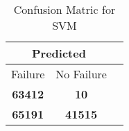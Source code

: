 \begin{table}[] 
\caption{Confusion Matric for SVM} 
\label{Table: Prediction Accuracy-NoneSVMSVMEKF-ignoresolarPanelDipole100.9EKF-top2-solarPanelDipole} 
\centering 
\begin{tabular} 
 {@{}ccc@{}} 
\toprule 
\multicolumn{2}{c}{\textbf{Predicted}}
 \\ \midrule 
\multicolumn{1}{|c|}{Failure} & 
\multicolumn{1}{c|}{No Failure}
 \\ \midrule 
\multicolumn{1}{|c|}{\color{red}\textbf{63412}} & 
\multicolumn{1}{c|}{\color{red}\textbf{10}}
 \\ \midrule 
\multicolumn{1}{|c|}{\color{green}\textbf{65191}} & 
\multicolumn{1}{c|}{\color{green}\textbf{41515}}
 \\ \bottomrule 
\end{tabular} 
\end{table} 
